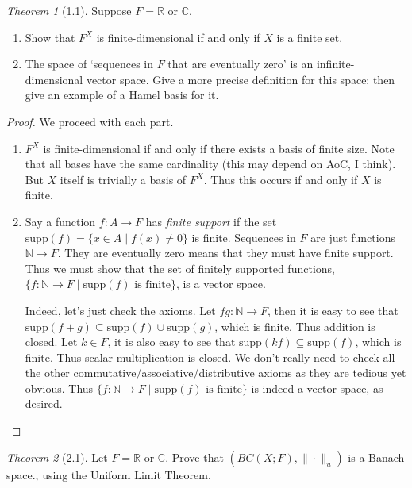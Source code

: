 \documentclass[12pt]{article}
\theoremstyle{remark}
\theoremstyle{named}
\newtheorem*{theorem}{Theorem}
\newcommand{\N}{\mathbb N}
\newcommand{\R}{\mathbb R}
\newcommand{\C}{\mathbb C}
\newcommand{\supp}[1]{\text{supp}({#1})}
\begin{document}
\begin{theorem}[1.1]
    Suppose \(F = \R\) or \(\C\).
    \begin{enumerate}
        \item Show that \(F^X\) is finite-dimensional if and only if \(X\) is a finite set.
        \item The space of `sequences in \(F\) that are eventually zero' is an infinite-dimensional vector space. Give a more precise definition for this space; then give an example of a Hamel basis for it.
    \end{enumerate}
\end{theorem}

\begin{proof}
    We proceed with each part.
    \begin{enumerate}
        \item \(F^X\) is finite-dimensional if and only if there exists a basis of finite size. Note that all bases have the same cardinality (this may depend on AoC, I think). But \(X\) itself is trivially a basis of \(F^X\). Thus this occurs if and only if \(X\) is finite.
        \item Say a function \(f : A \to F\) has \textit{finite support} if the set \(\supp{f} = \{x \in A \mid f(x) \neq 0\}\) is finite. Sequences in \(F\) are just functions \(\N \to F\). They are eventually zero means that they must have finite support. Thus we must show that the set of finitely supported functions, \(\{f : \N \to F \mid \supp{f} \text{ is finite}\}\), is a vector space. 

        Indeed, let's just check the axioms. Let \(f g : \N \to F\), then it is easy to see that \(\supp{f + g} \subseteq \supp{f} \cup  \supp g\), which is finite. Thus addition is closed. Let \(k \in F\), it is also easy to see that \(\supp{kf} \subseteq \supp{f}\), which is finite. 
        Thus scalar multiplication is closed. We don't really need to check all the other commutative/associative/distributive axioms as they are tedious yet obvious. Thus \(\{f : \N \to F \mid \supp{f} \text{ is finite}\}\) is indeed a vector space, as desired.
    \end{enumerate}
\end{proof}

\begin{theorem}[2.1]
    Let \(F = \R\) or \(\C\). Prove that \((BC(X;F), \|\cdot\|_u)\) is a Banach space., using the Uniform Limit Theorem.
\end{theorem}
\end{document}
